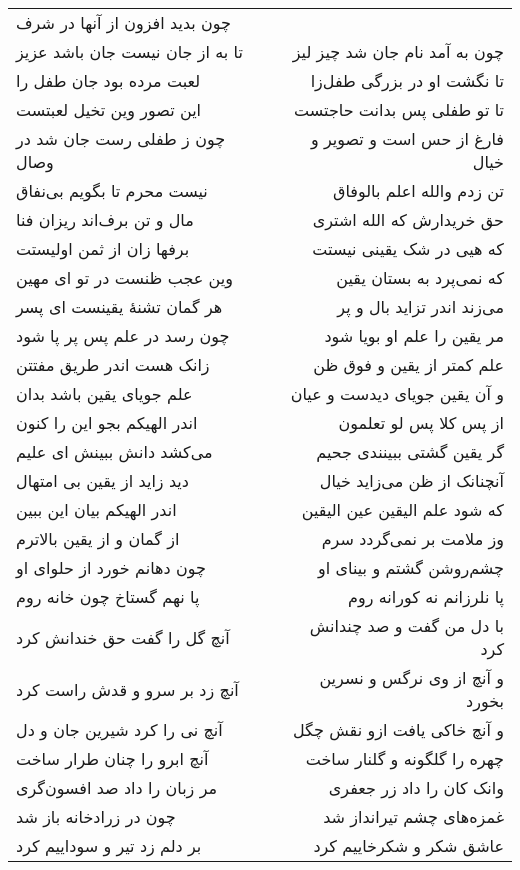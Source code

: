 \begin{center}
\begin{longtable}{l p{0.5cm} r}
چون بدید افزون از آنها در شرف
\\
تا به از جان نیست جان باشد عزیز
&&
چون به آمد نام جان شد چیز لیز
\\
لعبت مرده بود جان طفل را
&&
تا نگشت او در بزرگی طفل‌زا
\\
این تصور وین تخیل لعبتست
&&
تا تو طفلی پس بدانت حاجتست
\\
چون ز طفلی رست جان شد در وصال
&&
فارغ از حس است و تصویر و خیال
\\
نیست محرم تا بگویم بی‌نفاق
&&
تن زدم والله اعلم بالوفاق
\\
مال و تن برف‌اند ریزان فنا
&&
حق خریدارش که الله اشتری
\\
برفها زان از ثمن اولیستت
&&
که هیی در شک یقینی نیستت
\\
وین عجب ظنست در تو ای مهین
&&
که نمی‌پرد به بستان یقین
\\
هر گمان تشنهٔ یقینست ای پسر
&&
می‌زند اندر تزاید بال و پر
\\
چون رسد در علم پس پر پا شود
&&
مر یقین را علم او بویا شود
\\
زانک هست اندر طریق مفتتن
&&
علم کمتر از یقین و فوق ظن
\\
علم جویای یقین باشد بدان
&&
و آن یقین جویای دیدست و عیان
\\
اندر الهیکم بجو این را کنون
&&
از پس کلا پس لو تعلمون
\\
می‌کشد دانش ببینش ای علیم
&&
گر یقین گشتی ببینندی جحیم
\\
دید زاید از یقین بی امتهال
&&
آنچنانک از ظن می‌زاید خیال
\\
اندر الهیکم بیان این ببین
&&
که شود علم الیقین عین الیقین
\\
از گمان و از یقین بالاترم
&&
وز ملامت بر نمی‌گردد سرم
\\
چون دهانم خورد از حلوای او
&&
چشم‌روشن گشتم و بینای او
\\
پا نهم گستاخ چون خانه روم
&&
پا نلرزانم نه کورانه روم
\\
آنچ گل را گفت حق خندانش کرد
&&
با دل من گفت و صد چندانش کرد
\\
آنچ زد بر سرو و قدش راست کرد
&&
و آنچ از وی نرگس و نسرین بخورد
\\
آنچ نی را کرد شیرین جان و دل
&&
و آنچ خاکی یافت ازو نقش چگل
\\
آنچ ابرو را چنان طرار ساخت
&&
چهره را گلگونه و گلنار ساخت
\\
مر زبان را داد صد افسون‌گری
&&
وانک کان را داد زر جعفری
\\
چون در زرادخانه باز شد
&&
غمزه‌های چشم تیرانداز شد
\\
بر دلم زد تیر و سوداییم کرد
&&
عاشق شکر و شکرخاییم کرد

\end{longtable}
\end{center}
